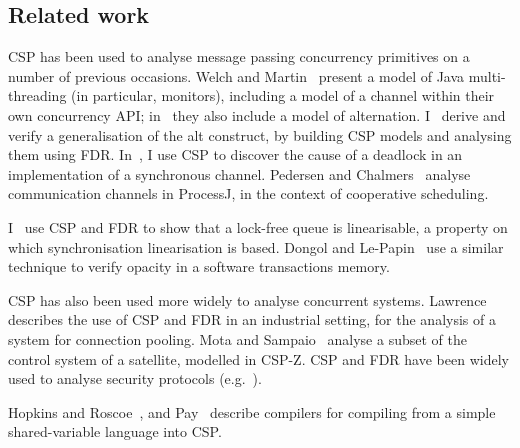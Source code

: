
\subsection{Related work}

CSP has been used to analyse message passing concurrency primitives on a
number of previous occasions.
%
Welch and Martin~\cite{welch-martin} present a model of Java multi-threading
(in particular, monitors), including a model of a channel within their own
concurrency API\@; in~\cite{welch-martin-cpa} they also include a model of
alternation.
%
I~\cite{gavin:alt} derive and verify a generalisation of the
alt construct, by building CSP models and analysing them using FDR.  
%
In~\cite{gavin:OneOne}, I use CSP to discover the cause of a deadlock in an
implementation of a synchronous channel. 
%
Pedersen and Chalmers~\cite{PC23} analyse communication channels in ProcessJ,
in the context of cooperative scheduling.

I~\cite{gavin:lock-free-queue} use CSP and FDR to show that a lock-free queue
is linearisable, a property on which synchronisation linearisation is based.
Dongol and Le-Papin~\cite{DlP:opacity} use a similar technique to verify
opacity in a software transactions memory. 

CSP has also been used more widely to analyse concurrent systems. 
%
Lawrence~\cite{lawrence} describes the use of CSP and FDR in an
industrial setting, for the analysis of a system for connection pooling.
% 
Mota and Sampaio~\cite{mota+sampaio} analyse a subset of the
control system of a satellite, modelled in CSP-Z\@.  
%
CSP and FDR have been widely used to analyse security protocols
(e.g.~\cite{gavin:NSFDR}).

Hopkins and Roscoe~\cite{hopkins-roscoe}, and Pay~\cite{alex:project} describe
compilers for compiling from a simple shared-variable language into CSP\@.






